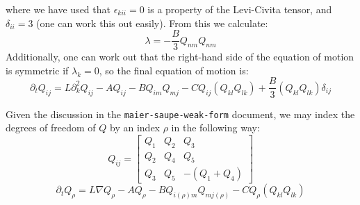 \documentclass[reqno]{article}
\begin{document}
    where we have used that $\epsilon_{kii} = 0$ is a property of the Levi-Civita tensor, and $\delta_{ii} = 3$ (one can work this out easily).
    From this we calculate:
    \begin{equation}
        \lambda = -\frac{B}{3} Q_{nm} Q_{nm}
    \end{equation}
    Additionally, one can work out that the right-hand side of the equation of motion is symmetric if $\lambda_k = 0$, so the final equation of motion is:
    \begin{equation}
        \partial_t Q_{ij}
        =
        L \partial_k^2 Q_{ij}
		- A Q_{ij}
		- B Q_{im} Q_{mj}
		- C Q_{ij} (Q_{kl} Q_{lk})
        + \frac{B}{3} (Q_{kl} Q_{lk}) \delta_{ij}
    \end{equation}

	Given the discussion in the \verb|maier-saupe-weak-form| document, we may index the degrees of freedom of $Q$ by an index $\rho$ in the following way:
	\begin{equation}
		Q_{ij}
		=
		\begin{bmatrix}
		Q_1 & Q_2 & Q_3 \\
		Q_2 & Q_4 & Q_5 \\
		Q_3 & Q_5 & -(Q_1 + Q_4)
		\end{bmatrix}
	\end{equation}
	\begin{equation}
		\partial_t Q_\rho
		= L \nabla Q_\rho
		- A Q_\rho
		- B Q_{i(\rho) m} Q_{m j(\rho)}
		- C Q_\rho (Q_{kl} Q_{lk})
	\end{equation}
	
\end{document}

